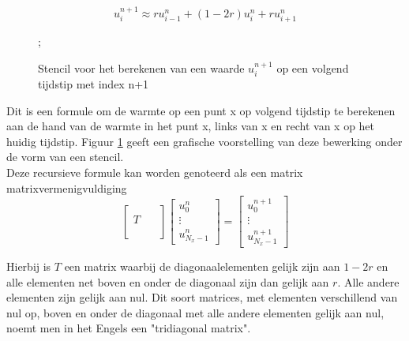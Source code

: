 \documentclass[a4paper,kulak]{kulakarticle} %
\newcommand{\stencilpt}[4][]{\node[circle,fill,draw,inner sep=1.5pt,label={above left:#4},#1] at (#2) (#3) {}}
\begin{document}
\begin{equation}
	u_i^{n+1} \approx r u_{i-1}^n + \left( 1 - 2r \right) u_i^n + r u_{i+1}^n 
	\label{eq:expl_recursive}
\end{equation}

\begin{figure}
\centering
{}
\label{fig:stencil_explicit};
\caption{Stencil voor het berekenen van een waarde $u_i^{n+1}$ op een volgend tijdstip met index n+1}
\end{figure}

Dit is een formule om de warmte op een punt x op volgend tijdstip te berekenen aan de hand van de warmte in het punt x, links van x en recht van x op het huidig tijdstip. Figuur \ref{fig:stencil_explicit} geeft een grafische voorstelling van deze bewerking onder de vorm van een stencil. \\
Deze recursieve formule kan worden genoteerd als een matrix matrixvermenigvuldiging
\begin{equation}
	\begin{bmatrix}
		\qquad \\
		T \\
		\\ 
	\end{bmatrix}
	\begin{bmatrix}
		u_0^n \\
		\vdots \\
		u_{N_x - 1}^n
	\end{bmatrix}
	=
	\begin{bmatrix}
		u_0^{n+1} \\
		\vdots \\
		u_{N_x - 1}^{n+1}
	\end{bmatrix}	
\end{equation}

Hierbij is $T$ een matrix waarbij de diagonaalelementen gelijk zijn aan $1-2r$ en alle elementen net boven en onder de diagonaal zijn dan gelijk aan $r$. Alle andere elementen zijn gelijk aan nul. Dit soort matrices, met elementen verschillend van nul op, boven en onder de diagonaal met alle andere elementen gelijk aan nul, noemt men in het Engels een "tridiagonal matrix".
\end{document}
